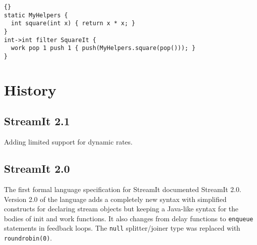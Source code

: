 \documentclass[11pt]{article}
\begin{document}
\begin{lstlisting}{}
static MyHelpers {
  int square(int x) { return x * x; }
}
int->int filter SquareIt {
  work pop 1 push 1 { push(MyHelpers.square(pop())); }
}
\end{lstlisting}

%



  


\section{History}

\subsection{StreamIt 2.1}

Adding limited support for dynamic rates.

\subsection{StreamIt 2.0}

The first formal language specification for StreamIt documented
StreamIt 2.0.  Version 2.0 of the language adds a completely new
syntax with simplified constructs for declaring stream objects but
keeping a Java-like syntax for the bodies of init and work functions.
It also changes
from delay functions to \lstinline|enqueue| statements in feedback
loops.  The \lstinline|null| splitter/joiner type was replaced with
\lstinline|roundrobin(0)|.
\end{document}
